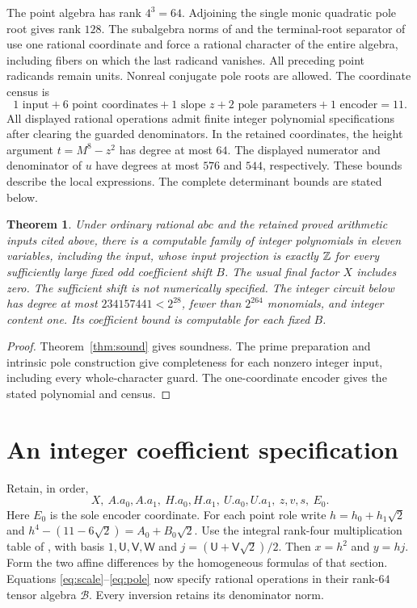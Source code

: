 \documentclass[11pt,a4paper]{article}
\newtheorem{theorem}{Theorem}[section]
\begin{document}
The point algebra has rank $4^3=64$. Adjoining the single monic
quadratic pole root gives rank $128$. The subalgebra norms of
\cite{Subalgebra} and the terminal-root separator of \cite{Terminal}
use one rational coordinate and force a rational character of the
entire algebra, including fibers on which the last radicand vanishes.
All preceding point radicands remain units. Nonreal conjugate pole
roots are allowed.
The coordinate census is
\[
 1\text{ input}+6\text{ point coordinates}+1\text{ slope }z
                 +2\text{ pole parameters}+1\text{ encoder}=11.
\]
All displayed rational operations admit finite integer polynomial
specifications after clearing the guarded denominators.
In the retained coordinates, the height argument $t=M^8-z^2$ has
degree at most $64$. The displayed numerator and denominator of $u$
have degrees at most $576$ and $544$, respectively. These bounds describe the local expressions. The complete determinant
bounds are stated below.

\begin{theorem}\label{thm:eleven}
Under ordinary rational $abc$ and the retained proved arithmetic
inputs cited above, there is a computable family of integer polynomials
in eleven variables, including the input, whose input projection is
exactly $\mathbb Z$ for every sufficiently large fixed odd coefficient shift
$B$. The usual final factor $X$ includes zero. The sufficient shift
is not numerically specified. The integer circuit below has degree at
most $234157441<2^{28}$, fewer than $2^{264}$ monomials, and
integer content one. Its coefficient bound is computable for each fixed $B$.
\end{theorem}
\begin{proof}
Theorem~\ref{thm:sound} gives soundness. The prime preparation and
intrinsic pole construction give completeness for each nonzero integer
input, including every whole-character guard. The one-coordinate
encoder gives the stated polynomial and census.
\end{proof}


\section{An integer coefficient specification}

Retain, in order,
\[
 X,\ A.a_0,A.a_1,\ H.a_0,H.a_1,\ U.a_0,U.a_1,\ z,v,s,\ E_0.
\]
Here $E_0$ is the sole encoder coordinate. For each point role write
$h=h_0+h_1\sqrt2$ and $h^4-(11-6\sqrt2)=A_0+B_0\sqrt2$.
Use the integral rank-four multiplication table of \cite[Section 2]{Unit},
with basis $1,\mathsf U,\mathsf V,\mathsf W$ and
$j=(\mathsf U+\mathsf V\sqrt2)/2$. Then $x=h^2$ and $y=hj$.
Form the two affine differences by the homogeneous formulas of that
section. Equations \eqref{eq:scale}--\eqref{eq:pole} now specify
rational operations in their rank-$64$ tensor algebra $\mathcal B$.
Every inversion retains its denominator norm.
\end{document}
